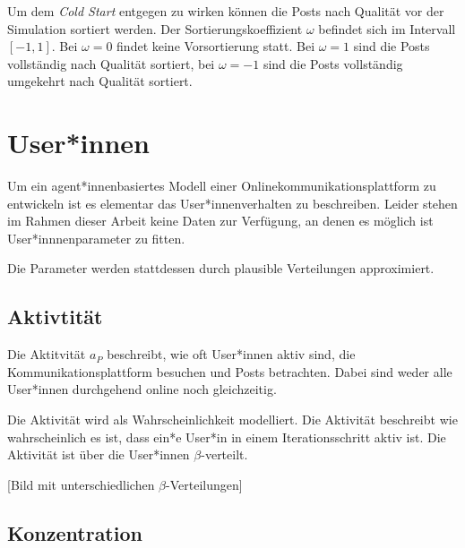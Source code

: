 Um dem \textit{Cold Start} entgegen zu wirken können die Posts nach Qualität vor der Simulation sortiert werden.
Der Sortierungskoeffizient $\omega$ befindet sich im Intervall $[-1,1]$. Bei $\omega=0$ findet keine Vorsortierung statt. Bei $\omega=1$ sind die Posts vollständig nach Qualität sortiert, bei $\omega=-1$ sind die Posts vollständig umgekehrt nach Qualität sortiert.


\section{User*innen}

Um ein agent*innenbasiertes Modell einer Onlinekommunikationsplattform zu entwickeln ist es elementar das User*innenverhalten zu beschreiben. Leider stehen im Rahmen dieser Arbeit keine Daten zur Verfügung, an denen es möglich ist User*innnenparameter zu fitten.

Die Parameter werden stattdessen durch plausible Verteilungen approximiert.

\subsection{Aktivtität}


Die Aktitvität  $a_P$ beschreibt, wie oft User*innen aktiv sind, die Kommunikationsplattform besuchen und Posts betrachten. Dabei sind weder alle User*innen durchgehend online noch gleichzeitig. 

Die Aktivität wird als Wahrscheinlichkeit modelliert. Die Aktivität beschreibt wie wahrscheinlich es ist, dass ein*e User*in in einem Iterationsschritt aktiv ist. Die Aktivität ist über die User*innen $\beta$-verteilt.


[Bild mit unterschiedlichen $\beta$-Verteilungen]

\subsection{Konzentration}


